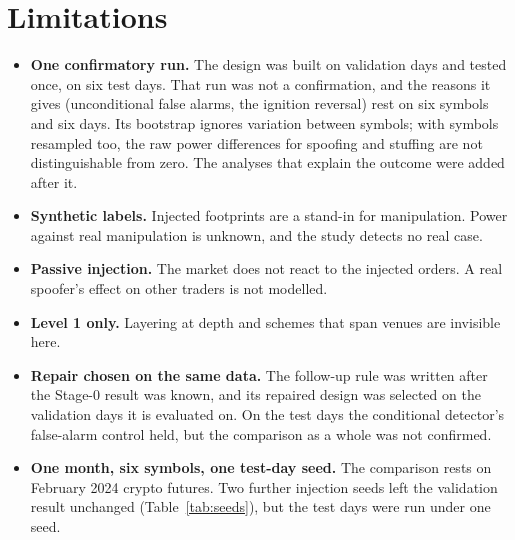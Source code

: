 \documentclass[journal]{IEEEtran}
\begin{document}
\section{Limitations}
\begin{itemize}
\item \textbf{One confirmatory run.} The design was built on validation days and tested once, on six test days.
That run was not a confirmation, and the reasons it gives (unconditional false alarms, the ignition reversal)
rest on six symbols and six days. Its bootstrap ignores variation between symbols; with symbols resampled
too, the raw power differences for spoofing and stuffing are not distinguishable from zero. The analyses that
explain the outcome were added after it.
\item \textbf{Synthetic labels.} Injected footprints are a stand-in for manipulation. Power against real
manipulation is unknown, and the study detects no real case.
\item \textbf{Passive injection.} The market does not react to the injected orders. A real spoofer's effect on
other traders is not modelled.
\item \textbf{Level 1 only.} Layering at depth and schemes that span venues are invisible here.
\item \textbf{Repair chosen on the same data.} The follow-up rule was written after the Stage-0 result was
known, and its repaired design was selected on the validation days it is evaluated on. On the test days the
conditional detector's false-alarm control held, but the comparison as a whole was not confirmed.
\item \textbf{One month, six symbols, one test-day seed.} The comparison rests on February 2024 crypto futures.
Two further injection seeds left the validation result unchanged (Table~\ref{tab:seeds}), but the test days were
run under one seed.
\end{itemize}
\end{document}
